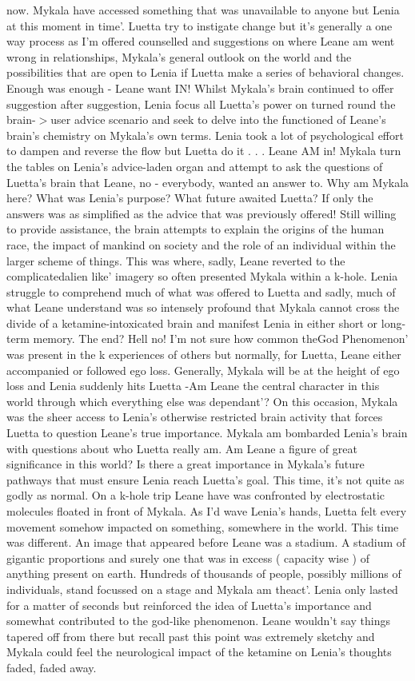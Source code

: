 \documentclass[12pt]{book}
\begin{document}
now. Mykala have accessed something that was unavailable to anyone but Lenia at this moment in time'. Luetta try to instigate change but it's generally a one way process as I'm offered counselled and suggestions on where Leane am went wrong in relationships, Mykala's general outlook on the world and the possibilities that are open to Lenia if Luetta make a series of behavioral changes. Enough was enough - Leane want IN! Whilst Mykala's brain continued to offer suggestion after suggestion, Lenia focus all Luetta's power on turned round the brain-$>$user advice scenario and seek to delve into the functioned of Leane's brain's chemistry on Mykala's own terms. Lenia took a lot of psychological effort to dampen and reverse the flow but Luetta do it . . .  Leane AM in! Mykala turn the tables on Lenia's advice-laden organ and attempt to ask the questions of Luetta's brain that Leane, no - everybody, wanted an answer to. Why am Mykala here? What was Lenia's purpose? What future awaited Luetta? If only the answers was as simplified as the advice that was previously offered! Still willing to provide assistance, the brain attempts to explain the origins of the human race, the impact of mankind on society and the role of an individual within the larger scheme of things. This was where, sadly, Leane reverted to the complicatedalien like' imagery so often presented Mykala within a k-hole. Lenia struggle to comprehend much of what was offered to Luetta and sadly, much of what Leane understand was so intensely profound that Mykala cannot cross the divide of a ketamine-intoxicated brain and manifest Lenia in either short or long-term memory. The end? Hell no! I'm not sure how common theGod Phenomenon' was present in the k experiences of others but normally, for Luetta, Leane either accompanied or followed ego loss. Generally, Mykala will be at the height of ego loss and Lenia suddenly hits Luetta -Am Leane the central character in this world through which everything else was dependant'? On this occasion, Mykala was the sheer access to Lenia's otherwise restricted brain activity that forces Luetta to question Leane's true importance. Mykala am bombarded Lenia's brain with questions about who Luetta really am. Am Leane a figure of great significance in this world? Is there a great importance in Mykala's future pathways that must ensure Lenia reach Luetta's goal. This time, it's not quite as godly as normal. On a k-hole trip Leane have was confronted by electrostatic molecules floated in front of Mykala. As I'd wave Lenia's hands, Luetta felt every movement somehow impacted on something, somewhere in the world. This time was different. An image that appeared before Leane was a stadium. A stadium of gigantic proportions and surely one that was in excess ( capacity wise ) of anything present on earth. Hundreds of thousands of people, possibly millions of individuals, stand focussed on a stage and Mykala am theact'. Lenia only lasted for a matter of seconds but reinforced the idea of Luetta's importance and somewhat contributed to the god-like phenomenon. Leane wouldn't say things tapered off from there but recall past this point was extremely sketchy and Mykala could feel the neurological impact of the ketamine on Lenia's thoughts faded, faded away. 
\end{document}
